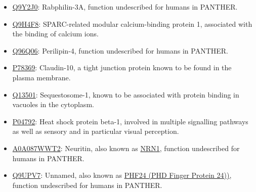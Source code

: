{
\small

\begin{itemize}
\item \href{http://www.pantherdb.org/genes/gene.do?acc=HUMAN\%7CHGNC\%3D17056\%7CUniProtKB\%3DQ9Y2J0}{Q9Y2J0}: Rabphilin-3A, function undescribed for humans in PANTHER.
\item \href{http://www.pantherdb.org/genes/gene.do?acc=HUMAN\%7CHGNC\%3D20318\%7CUniProtKB\%3DQ9H4F8}{Q9H4F8}: SPARC-related modular calcium-binding protein 1, associated with the binding of calcium ions.
\item \href{http://www.pantherdb.org/genes/gene.do?acc=HUMAN\%7CHGNC\%3D29393\%7CUniProtKB\%3DQ96Q06}{Q96Q06}: Perilipin-4, function undescribed for humans in PANTHER.
\item \href{http://www.pantherdb.org/genes/gene.do?acc=HUMAN\%7CHGNC\%3D2033\%7CUniProtKB\%3DP78369}{P78369}: Claudin-10,  a tight junction protein known to be found in the plasma membrane.
\item \href{http://www.pantherdb.org/genes/gene.do?acc=HUMAN\%7CHGNC\%3D11280\%7CUniProtKB\%3DQ13501}{Q13501}: Sequestosome-1, known to be associated with protein binding in vacuoles in the cytoplasm.
\item \href{http://www.pantherdb.org/genes/gene.do?acc=HUMAN\%7CHGNC\%3D5246\%7CUniProtKB\%3DP04792}{P04792}: Heat shock protein beta-1, involved in multiple signalling pathways as well as sensory and in particular visual perception.
\item \href{http://www.pantherdb.org/genes/gene.do?acc=HUMAN\%7CHGNC\%3D17972\%7CUniProtKB\%3DQ9NPD7}{A0A087WWT2}: Neuritin, also known as \href{https://www.uniprot.org/uniprot/A0A087WWT2}{NRN1}, function undescribed for humans in PANTHER.
\item \href{http://www.pantherdb.org/genes/gene.do?acc=HUMAN\%7CHGNC\%3D29180\%7CUniProtKB\%3DQ9UPV7}{Q9UPV7}: Unnamed, also known as \href{https://www.uniprot.org/uniprot/Q9UPV7}{PHF24 (PHD Finger Protein 24))}, function undescribed for humans in PANTHER.
\end{itemize}

}

